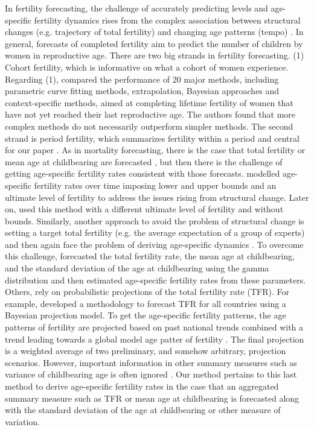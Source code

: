 \documentclass[12pt,a4paper,twoside]{article}
\begin{document}
In fertility forecasting, the challenge of accurately predicting levels and age-specific fertility dynamics rises from the complex association between structural changes (e.g. trajectory of total fertility) and changing age patterns (tempo) \citep{Booth2006}.  In general, forecasts of completed fertility aim to predict the number of children by women in reproductive age.  There are two big strands in fertility forecasting. (1) Cohort fertility, which is informative on what a cohort of women experience. Regarding (1), \citet{bohk2018forecast} compared the performance of 20 major methods, including parametric curve fitting methods, extrapolation, Bayesian approaches and context-specific methods, aimed at completing lifetime fertility of women that have not yet reached their last reproductive age. The authors found that more complex methods do not necessarily outperform simpler methods. The second strand is period fertility, which summarizes fertility within a period and central for our paper \citep{bohk2018forecast}. As in mortality forecasting, there is the case that total fertility or mean age at childbearing are forecasted \citep{miller1986bivariate}, but then there is the challenge of getting age-specific fertility rates consistent with those forecasts. \citet{lee1993modeling} modelled age-specific fertility rates over time imposing lower and upper bounds and an ultimate level of fertility to address the issues rising from structural change. Later on, \citet{lee1994stochastic} used this method with a different ultimate level of fertility and without bounds. Similarly, another approach to avoid the problem of structural change is setting a target total fertility (e.g. the average expectation of a group of experts) and then again face the problem of deriving age-specific dynamics \citep{lutz1996world}. To overcome this challenge, \citet{thompson1989multivariate} forecasted the total fertility rate, the mean age at childbearing, and the standard deviation of the age at childbearing using the gamma distribution and then estimated age-specific fertility rates from these parameters. Others, rely on probabilistic projections of the total fertility rate (TFR). For example, \citet{alkema2011probabilistic} developed a methodology to forecast TFR for all countries using a Bayesian projection model. To get the age-specific fertility patterns, the age patterns of fertility are projected based on past national trends combined with a trend leading towards a global model age patter of fertility \citep{vsevvcikova2016age, UN2017}. The final projection is a weighted average of two preliminary, and somehow arbitrary, projection scenarios. However, important information in other summary measures such as variance of childbearing age is often ignored \citep{hruschka2016does}. Our method pertains to this last method to derive age-specific fertility rates in the case that an aggregated summary measure such as TFR or mean age at childbearing is forecasted along with the standard deviation of the age at childbearing or other measure of variation. 
\end{document}
